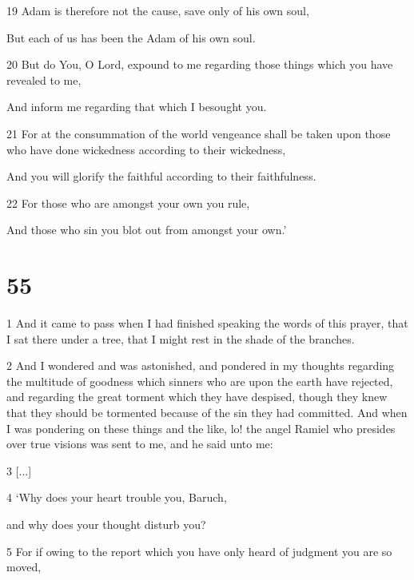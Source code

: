 \par 19 Adam is therefore not the cause, save only of his own soul,

\par But each of us has been the Adam of his own soul.

\par 20 But do You, O Lord, expound to me regarding those things which you have revealed to me,

\par And inform me regarding that which I besought you.

\par 21 For at the consummation of the world vengeance shall be taken upon those who have done wickedness according to their wickedness,

\par And you will glorify the faithful according to their faithfulness.

\par 22 For those who are amongst your own you rule,

\par And those who sin you blot out from amongst your own.’

\chapter{55}

\par 1 And it came to pass when I had finished speaking the words of this prayer, that I sat there under a tree, that I might rest in the shade of the branches. 

\par 2 And I wondered and was astonished, and pondered in my thoughts regarding the multitude of goodness which sinners who are upon the earth have rejected, and regarding the great torment which they have despised, though they knew that they should be tormented because of the sin they had committed. And when I was pondering on these things and the like, lo! the angel Ramiel who presides over true visions was sent to me, and he said unto me:

\par 3 [...]

\par 4 ‘Why does your heart trouble you, Baruch,

\par and why does your thought disturb you?

\par 5 For if owing to the report which you have only heard of judgment you are so moved,

